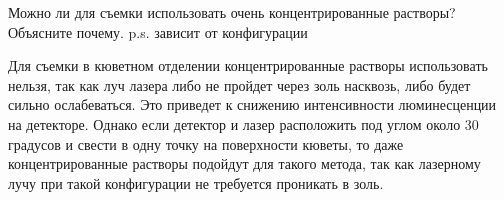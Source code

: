 
Можно ли для съемки использовать очень концентрированные растворы? Объясните почему. p.s. зависит от конфигурации

\explanationSection

Для съемки в кюветном отделении концентрированные растворы использовать нельзя, так как луч лазера либо не пройдет через золь насквозь, либо будет сильно ослабеваться. Это приведет к снижению интенсивности люминесценции на детекторе. Однако если детектор и лазер расположить под углом около 30 градусов и свести в одну точку на поверхности кюветы, то даже концентрированные растворы подойдут для такого метода, так как лазерному лучу при такой конфигурации не требуется проникать в золь.
